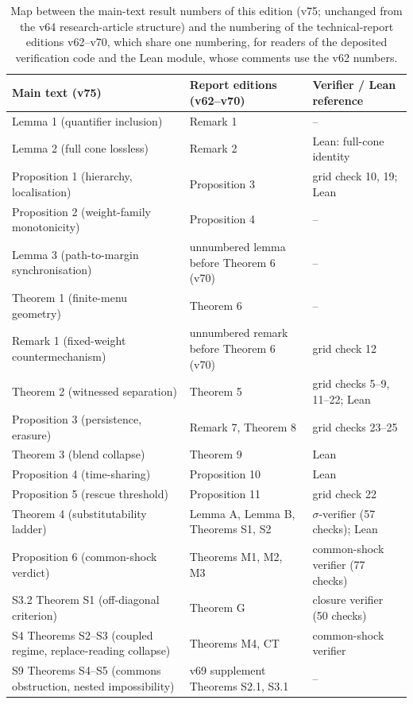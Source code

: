 \documentclass[preprint,11pt,authoryear]{elsarticle}
\theoremstyle{remark}
\begin{document}
\begin{table}[!htbp]
\centering\small
\caption{Map between the main-text result numbers of this edition (v75; unchanged from the v64 research-article structure) and the numbering of the technical-report editions v62--v70, which share one numbering, for readers of the deposited verification code and the Lean module, whose comments use the v62 numbers.}
\begin{tabularx}{\textwidth}{@{}>{\raggedright\arraybackslash}p{}>{\raggedright\arraybackslash}p{}X@{}}
\toprule
Main text (v75) & Report editions (v62--v70) & Verifier / Lean reference \\
\midrule
Lemma 1 (quantifier inclusion) & Remark 1 & -- \\
Lemma 2 (full cone lossless) & Remark 2 & Lean: full-cone identity \\
Proposition 1 (hierarchy, localisation) & Proposition 3 & grid check 10, 19; Lean \\
Proposition 2 (weight-family monotonicity) & Proposition 4 & -- \\
Lemma 3 (path-to-margin synchronisation) & unnumbered lemma before Theorem 6 (v70) & -- \\
Theorem 1 (finite-menu geometry) & Theorem 6 & -- \\
Remark 1 (fixed-weight countermechanism) & unnumbered remark before Theorem 6 (v70) & grid check 12 \\
Theorem 2 (witnessed separation) & Theorem 5 & grid checks 5--9, 11--22; Lean \\
Proposition 3 (persistence, erasure) & Remark 7, Theorem 8 & grid checks 23--25 \\
Theorem 3 (blend collapse) & Theorem 9 & Lean \\
Proposition 4 (time-sharing) & Proposition 10 & Lean \\
Proposition 5 (rescue threshold) & Proposition 11 & grid check 22 \\
Theorem 4 (substitutability ladder) & Lemma A, Lemma B, Theorems S1, S2 & $\sigma$-verifier (57 checks); Lean \\
Proposition 6 (common-shock verdict) & Theorems M1, M2, M3 & common-shock verifier (77 checks) \\
S3.2 Theorem S1 (off-diagonal criterion) & Theorem G & closure verifier (50 checks) \\
S4 Theorems S2--S3 (coupled regime, replace-reading collapse) & Theorems M4, CT & common-shock verifier \\
S9 Theorems S4--S5 (commons obstruction, nested impossibility) & v69 supplement Theorems S2.1, S3.1 & -- \\
\bottomrule
\end{tabularx}
\end{table}
\end{document}
